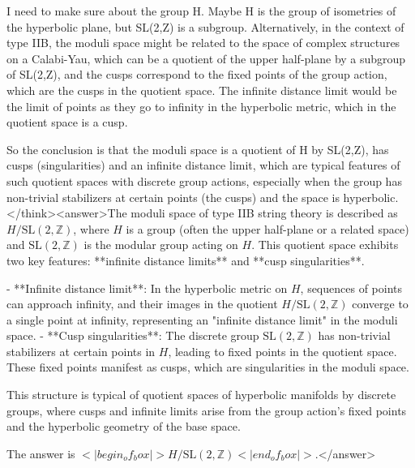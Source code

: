 I need to make sure about the group H. Maybe H is the group of isometries of the hyperbolic plane, but SL(2,Z) is a subgroup. Alternatively, in the context of type IIB, the moduli space might be related to the space of complex structures on a Calabi-Yau, which can be a quotient of the upper half-plane by a subgroup of SL(2,Z), and the cusps correspond to the fixed points of the group action, which are the cusps in the quotient space. The infinite distance limit would be the limit of points as they go to infinity in the hyperbolic metric, which in the quotient space is a cusp. 

So the conclusion is that the moduli space is a quotient of H by SL(2,Z), has cusps (singularities) and an infinite distance limit, which are typical features of such quotient spaces with discrete group actions, especially when the group has non-trivial stabilizers at certain points (the cusps) and the space is hyperbolic.</think><answer>The moduli space of type IIB string theory is described as \( H/\text{SL}(2, \mathbb{Z}) \), where \( H \) is a group (often the upper half-plane or a related space) and \( \text{SL}(2, \mathbb{Z}) \) is the modular group acting on \( H \). This quotient space exhibits two key features: **infinite distance limits** and **cusp singularities**.  

- **Infinite distance limit**: In the hyperbolic metric on \( H \), sequences of points can approach infinity, and their images in the quotient \( H/\text{SL}(2, \mathbb{Z}) \) converge to a single point at infinity, representing an "infinite distance limit" in the moduli space.  
- **Cusp singularities**: The discrete group \( \text{SL}(2, \mathbb{Z}) \) has non-trivial stabilizers at certain points in \( H \), leading to fixed points in the quotient space. These fixed points manifest as cusps, which are singularities in the moduli space.  

This structure is typical of quotient spaces of hyperbolic manifolds by discrete groups, where cusps and infinite limits arise from the group action's fixed points and the hyperbolic geometry of the base space.  

The answer is \(<|begin_of_box|>H/\text{SL}(2,\mathbb{Z})<|end_of_box|>\).</answer>